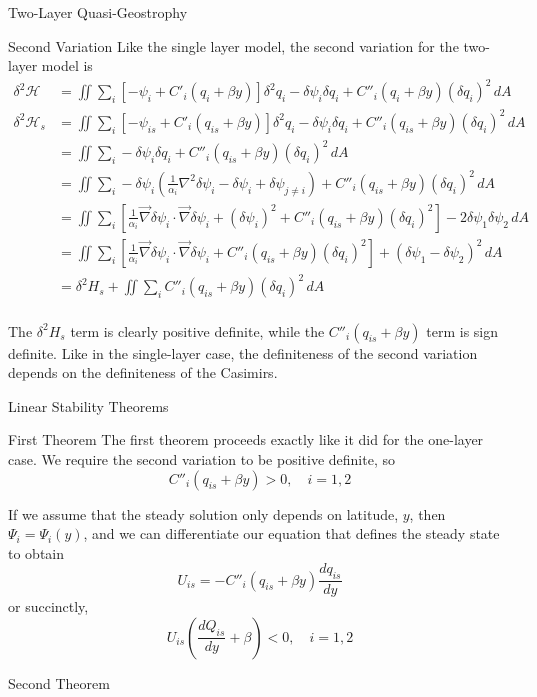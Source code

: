 \documentclass[12pt]{article}
\begin{document}
\begin{section}{Two-Layer Quasi-Geostrophy}
    \begin{subsection}{Second Variation}
        Like the single layer model, the second variation for the two-layer model is
        \begin{align*}
            \delta^2 \mathcal{H} &= \iint \sum_i \left[ - \psi_i + C'_i(q_i + \beta y) \right]  \delta^2 q_i  - \delta \psi_i \delta q_i +  C''_i(q_i + \beta y) (\delta q_i)^2  \, dA \\
            \delta^2 \mathcal{H}_s &= \iint \sum_i \left[ - \psi_{is} + C'_i(q_{is} + \beta y) \right]  \delta^2 q_i  - \delta \psi_i \delta q_i +  C''_i(q_{is} + \beta y) (\delta q_i)^2  \, dA \\
            &= \iint \sum_i - \delta \psi_i \delta q_i +  C''_i(q_{is} + \beta y) (\delta q_i)^2  \, dA \\
            &= \iint \sum_i - \delta \psi_i \left( \frac{1}{\alpha_i} \nabla^2 \delta \psi_i - \delta\psi_i + \delta\psi_{j \ne i} \right) +  C''_i(q_{is} + \beta y) (\delta q_i)^2  \, dA \\
            &= \iint \sum_i \left[ \frac{1}{\alpha_i} \vec\nabla\delta\psi_i \cdot \vec\nabla\delta\psi_i + (\delta\psi_i)^2 + C''_i(q_{is} + \beta y) (\delta q_i)^2 \right]  - 2\delta\psi_1\delta\psi_2 \, dA \\
            &= \iint \sum_i \left[ \frac{1}{\alpha_i} \vec\nabla\delta\psi_i \cdot \vec\nabla\delta\psi_i + C''_i(q_{is} + \beta y) (\delta q_i)^2 \right]+ (\delta\psi_1 - \delta\psi_2)^2 \, dA \\
            &= \delta^2 H_s + \iint \sum_i C''_i(q_{is} + \beta y)(\delta q_i)^2 \, dA \\
        \end{align*}

        The $\delta^2 H_s$ term is clearly positive definite, while the $C''_i(q_{is} + \beta y)$ term is sign definite. Like in the single-layer case, the definiteness of the second variation depends on the definiteness of the Casimirs.
    \end{subsection}

    \begin{subsection}{Linear Stability Theorems}
        \begin{subsubsection}{First Theorem}
            The first theorem proceeds exactly like it did for the one-layer case. We require the second variation to be positive definite, so
            $$
            C''_i(q_{is} + \beta y) > 0, \quad i=1,2
            $$

            If we assume that the steady solution only depends on latitude, $y$, then $\Psi_i = \Psi_i(y)$, and we can differentiate our equation that defines the steady state to obtain
            $$
            U_{is} = -C''_i(q_{is} + \beta y) \frac{dq_{is}}{dy}
            $$
            or succinctly,
            $$
            U_{is} \left(\frac{d Q_{is}}{dy} + \beta \right) < 0, \quad i=1,2
            $$
        \end{subsubsection}
        \begin{subsubsection}{Second Theorem}
        \end{subsubsection}
    \end{subsection}


\end{section}
\end{document}
